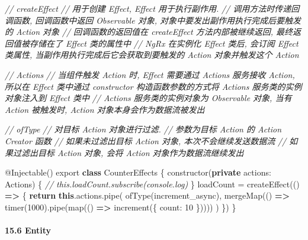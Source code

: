 \documentclass[
]{article}
\newenvironment{Shaded}{}{}
\newcommand{\AttributeTok}[1]{\textcolor[rgb]{0.49,0.56,0.16}{#1}}
\newcommand{\CommentTok}[1]{\textcolor[rgb]{0.38,0.63,0.69}{\textit{#1}}}
\newcommand{\ControlFlowTok}[1]{\textcolor[rgb]{0.00,0.44,0.13}{\textbf{#1}}}
\newcommand{\DataTypeTok}[1]{\textcolor[rgb]{0.56,0.13,0.00}{#1}}
\newcommand{\DecValTok}[1]{\textcolor[rgb]{0.25,0.63,0.44}{#1}}
\newcommand{\FunctionTok}[1]{\textcolor[rgb]{0.02,0.16,0.49}{#1}}
\newcommand{\ImportTok}[1]{#1}
\newcommand{\KeywordTok}[1]{\textcolor[rgb]{0.00,0.44,0.13}{\textbf{#1}}}
\newcommand{\NormalTok}[1]{#1}
\newcommand{\OperatorTok}[1]{\textcolor[rgb]{0.40,0.40,0.40}{#1}}
\begin{document}
\begin{enumerate}
\begin{Shaded}
\begin{Highlighting}[]
\CommentTok{// createEffect}
\CommentTok{// 用于创建 Effect, Effect 用于执行副作用.}
\CommentTok{// 调用方法时传递回调函数, 回调函数中返回 Observable 对象, 对象中要发出副作用执行完成后要触发的 Action 对象}
\CommentTok{// 回调函数的返回值在 createEffect 方法内部被继续返回, 最终返回值被存储在了 Effect 类的属性中}
\CommentTok{// NgRx 在实例化 Effect 类后, 会订阅 Effect 类属性, 当副作用执行完成后它会获取到要触发的 Action 对象并触发这个 Action}

\CommentTok{// Actions}
\CommentTok{// 当组件触发 Action 时, Effect 需要通过 Actions 服务接收 Action, 所以在 Effect 类中通过 constructor 构造函数参数的方式将 Actions 服务类的实例对象注入到 Effect 类中}
\CommentTok{// Actions 服务类的实例对象为 Observable 对象, 当有 Action 被触发时, Action 对象本身会作为数据流被发出}

\CommentTok{// ofType}
\CommentTok{// 对目标 Action 对象进行过滤.}
\CommentTok{// 参数为目标 Action 的 Action Creator 函数}
\CommentTok{// 如果未过滤出目标 Action 对象, 本次不会继续发送数据流}
\CommentTok{// 如果过滤出目标 Action 对象, 会将 Action 对象作为数据流继续发出}

\NormalTok{@}\FunctionTok{Injectable}\NormalTok{()}
\ImportTok{export} \KeywordTok{class}\NormalTok{ CounterEffects \{}
  \FunctionTok{constructor}\NormalTok{(}\KeywordTok{private} \DataTypeTok{actions}\OperatorTok{:}\NormalTok{ Actions) \{}
    \CommentTok{// this.loadCount.subscribe(console.log)}
\NormalTok{  \}}
\NormalTok{  loadCount }\OperatorTok{=} \FunctionTok{createEffect}\NormalTok{(() }\KeywordTok{=\textgreater{}}\NormalTok{ \{}
    \ControlFlowTok{return} \KeywordTok{this}\OperatorTok{.}\AttributeTok{actions}\OperatorTok{.}\FunctionTok{pipe}\NormalTok{(}
      \FunctionTok{ofType}\NormalTok{(increment\_async)}\OperatorTok{,}
      \FunctionTok{mergeMap}\NormalTok{(() }\KeywordTok{=\textgreater{}} \FunctionTok{timer}\NormalTok{(}\DecValTok{1000}\NormalTok{)}\OperatorTok{.}\FunctionTok{pipe}\NormalTok{(}\FunctionTok{map}\NormalTok{(() }\KeywordTok{=\textgreater{}} \FunctionTok{increment}\NormalTok{(\{ }\DataTypeTok{count}\OperatorTok{:} \DecValTok{10}\NormalTok{ \}))))}
\NormalTok{    )}
\NormalTok{  \})}
\NormalTok{\}}
\end{Highlighting}
\end{Shaded}
\end{enumerate}

\hypertarget{156-entity}{%
\paragraph{15.6 Entity}\label{156-entity}}
\end{document}
